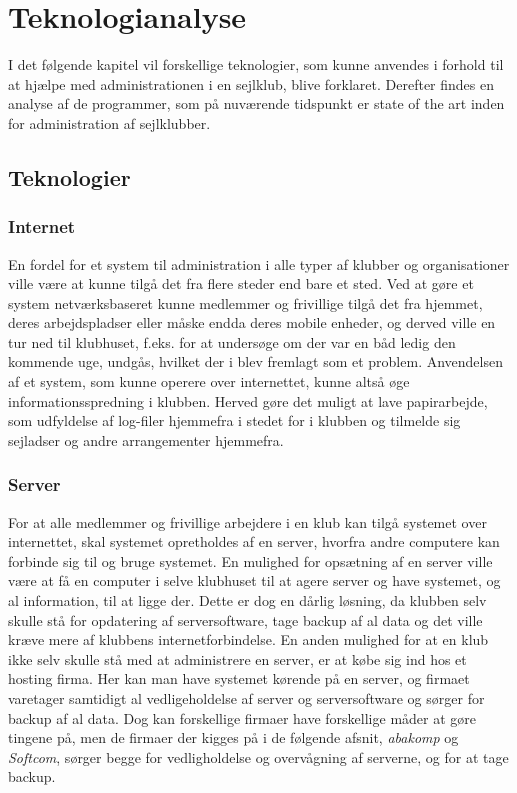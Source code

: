 \chapter{Teknologianalyse}\label{chap:teknologi-analyse}

I det følgende kapitel vil forskellige teknologier, som kunne anvendes i forhold til at hjælpe med
administrationen i en sejlklub, blive forklaret. Derefter findes en analyse af de programmer, som på nuværende
tidspunkt er state of the art inden for administration af sejlklubber.

\section{Teknologier}

\subsection{Internet}

En fordel for et system til administration i alle typer af klubber og organisationer ville være at kunne tilgå
det fra flere steder end bare et sted. Ved at gøre et system netværksbaseret kunne medlemmer og frivillige
tilgå det fra hjemmet, deres arbejdspladser eller måske endda deres mobile enheder, og derved ville en tur ned
til klubhuset, f.eks. for at undersøge om der var en båd ledig den kommende uge, undgås, hvilket der i
 blev fremlagt som et problem. Anvendelsen af et system, som kunne operere
over internettet, kunne altså øge informationsspredning i klubben. Herved gøre det muligt at lave papirarbejde, som
udfyldelse af log-filer hjemmefra i stedet for i klubben og tilmelde sig sejladser og andre arrangementer
hjemmefra.


\subsection{Server}

For at alle medlemmer og frivillige arbejdere i en klub kan tilgå systemet over internettet, skal systemet
opretholdes af en server, hvorfra andre computere kan forbinde sig til og bruge systemet. En mulighed for
opsætning af en server ville være at få en computer i selve klubhuset til at agere server og have systemet, og
al information, til at ligge der. Dette er dog en dårlig løsning, da klubben selv skulle stå for opdatering af
serversoftware, tage backup af al data og det ville kræve mere af klubbens internetforbindelse. En anden
mulighed for at en klub ikke selv skulle stå med at administrere en server, er at købe sig ind hos et hosting
firma. Her kan man have systemet kørende på en server, og firmaet varetager samtidigt al vedligeholdelse af
server og serversoftware og sørger for backup af al data. Dog kan forskellige firmaer have forskellige måder
at gøre tingene på, men de firmaer der kigges på i de følgende afsnit, \textit{abakomp} og \textit{Softcom}, sørger begge for vedligholdelse og overvågning af serverne, og for at tage backup. 

